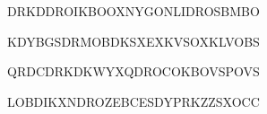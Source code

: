 \documentclass[12pt]{article}
\begin{document}
\begin{enumerate}
{{DRKDDROIKBOOXNYGONLIDROSBMBO

KDYBGSDRMOBDKSXEXKVSOXKLVOBS

QRDCDRKDKWYXQDROCOKBOVSPOVS

LOBDIKXNDROZEBCESDYPRKZZSXOCC

}
}
%
%
%
%
%
%

\bigskip




\end{enumerate}
\end{document}
